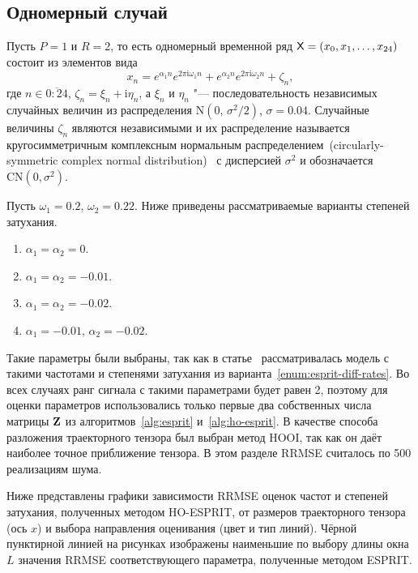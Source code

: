 \documentclass[specialist,
  substylefile=spbu_report.rtx,
subf,href,colorlinks=true, 12pt]{disser}
\theoremstyle{plain}
\theoremstyle{definition}
\theoremstyle{remark}
\newcommand{\iu}{\mathrm{i}}
\begin{document}
\subsection{Одномерный случай}\label{subsec:esprit-comparison}
Пусть $P=1$ и $R=2$, то есть одномерный временной ряд $\mathsf{X} =
\left(x_0, x_1, \ldots, x_{24}\right)$
состоит из элементов вида
\begin{equation}\label{eq:esprit-1d-series}
  x_n = e^{ \alpha_1 n }
  e^{2 \pi\iu \omega_1 n} +
  e^{ \alpha_2 n }
  e^{ 2 \pi \iu \omega_2 n} + \zeta_n,
\end{equation}
где $n \in \overline{0:24}$, $\zeta_n = \xi_n + \iu \eta_n$, а
$\xi_n$ и $\eta_n$ "--- последовательность независимых случайных величин из
распределения $\mathrm{N}(0,\, \sigma^2 / 2)$, $\sigma=0.04$.
Случайные величины $\zeta_n$ являются независимыми и их
распределение называется кругосимметричным комплексным нормальным
распределением~(circularly-symmetric complex normal
distribution)~\cite{ComplexNormal} с дисперсией
$\sigma^2$ и обозначается
$\mathrm{CN}(0, \sigma^2)$.

Пусть $\omega_1 = 0.2$, $\omega_2 = 0.22$.
Ниже приведены рассматриваемые варианты степеней затухания.
\begin{enumerate}
  \item\label{enum:esprit-no-rates} $\alpha_1=\alpha_2=0$.
  \item\label{enum:esprit-smalleq-rates} $\alpha_1=\alpha_2=-0.01$.
  \item\label{enum:esprit-bigeq-rates} $\alpha_1=\alpha_2=-0.02$.
  \item\label{enum:esprit-diff-rates} $\alpha_1= -0.01$, $\alpha_2=-0.02$.
\end{enumerate}
Такие параметры были выбраны, так как в статье~\cite{hosvd-hooi-separation}
рассматривалась модель с такими частотами и степенями затухания из
варианта~\ref{enum:esprit-diff-rates}.
Во всех случаях ранг сигнала с такими параметрами будет равен 2,
поэтому для оценки параметров
использовались только первые два собственных числа матрицы $\mathbf{Z}$ из
алгоритмов~\ref{alg:esprit}
и~\ref{alg:ho-esprit}.
В качестве способа разложения траекторного тензора был выбран
метод HOOI, так как он даёт наиболее точное приближение
тензора.
В этом разделе RRMSE считалось по 500 реализациям шума.

Ниже представлены графики зависимости RRMSE оценок частот и
степеней затухания,
полученных методом HO-ESPRIT, от размеров траекторного тензора
(ось $x$) и выбора направления оценивания (цвет и тип линий).
Чёрной пунктирной линией на рисунках изображены наименьшие по выбору
длины окна $L$ значения RRMSE
соответствующего параметра, полученные методом ESPRIT.
\end{document}
